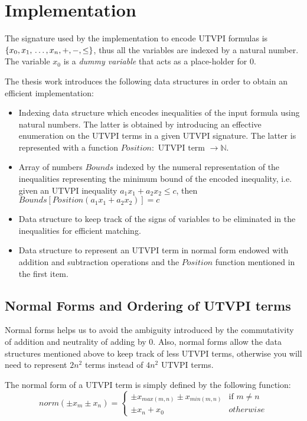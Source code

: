 \section{Implementation}

The signature used by the 
implementation to encode UTVPI formulas
is $\{x_0, x_1, \\ \dots, x_n, +,
-, \leq \}$, thus all the variables are indexed by a natural number. 
The variable $x_0$ is a
\emph{dummy variable} that acts as a place-holder for 0. 

The thesis work introduces the following data structures
in order to obtain an efficient implementation:

\begin{itemize}
  \item Indexing data structure
    which encodes inequalities of the input formula 
    using natural numbers. The latter is obtained
    by introducing an effective enumeration on the
    UTVPI terms in a given UTVPI signature. The
    latter is represented with a function
    $Position : \text{ UTVPI term } \rightarrow \mathbb{N}$.
  \item Array of numbers $Bounds$ indexed by the 
    numeral representation of the inequalities 
    representing the minimum bound of 
    the encoded inequality, i.e. given an UTVPI
    inequality $a_1 x_1 + a_2 x_2 \leq c$,
    then $Bounds[Position(a_1 x_1 + a_2 x_2)] = c$
  \item Data structure to keep 
    track of the signs of variables to be eliminated
    in the inequalities for efficient matching.
  \item Data structure to represent an UTVPI
    term in normal form endowed with addition and subtraction 
    operations and the $Position$ function mentioned
    in the first item.
\end{itemize}

\subsection{Normal Forms and Ordering of UTVPI terms}

Normal forms helps us to avoid the 
ambiguity introduced
by the commutativity of addition and 
neutrality of adding by 0.
Also, normal forms allow the data
structures mentioned above to keep 
track of less UTVPI terms, otherwise you 
will need to 
represent $2n^2$ terms instead of $4n^2$ 
UTVPI terms.

The normal form of a UTVPI term is simply 
defined by the following function: 
\begin{equation*}
  norm(\pm x_m \pm x_n) = 
  \begin{cases} 
    \pm x_{max(m, n)} \pm x_{min(m, n)} & \text{if } m \neq n \\
    \pm x_{n} + x_0  & otherwise
  \end{cases}
\end{equation*}

